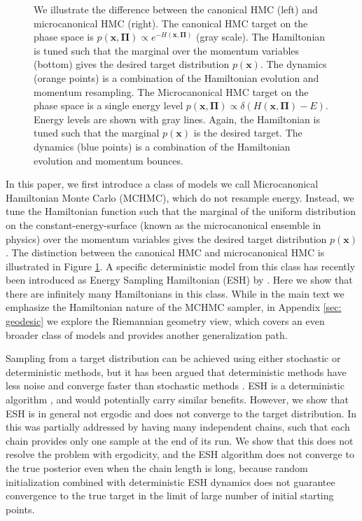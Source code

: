\documentclass[twoside,11pt]{article}
\newcommand{\p}{\boldsymbol{\Pi}}
\newcommand{\x}{\boldsymbol{x}}
\begin{document}
\begin{figure}
    \caption{We illustrate the difference between the canonical HMC (left) and microcanonical HMC (right).
    The canonical HMC target on the phase space is $p(\x, \p) \propto e^{-H(\x, \p)}$ (gray scale). The Hamiltonian is tuned such that the marginal over the momentum variables (bottom) gives the desired target distribution $p(\x)$. The dynamics (orange points) is a combination of the Hamiltonian evolution and momentum resampling.
    The Microcanonical HMC target on the phase space is a single energy level $p(\x, \p) \propto \delta(H(\x, \p) - E)$. Energy levels are shown with gray lines. Again, the Hamiltonian is tuned such that the marginal $p(\x)$ is the desired target. The dynamics  (blue points) is a combination of the Hamiltonian evolution and momentum bounces. 
    } 
    \label{fig: illustration}
\end{figure}


In this paper, we first introduce a class of 
models we call Microcanonical Hamiltonian Monte Carlo (MCHMC), which do not  resample energy. Instead, we tune the Hamiltonian function such that the marginal of the uniform distribution on the constant-energy-surface (known as the microcanonical ensemble in physics) over the momentum variables gives the desired target distribution $p(\x)$. 
The distinction between the canonical HMC and microcanonical HMC is illustrated in Figure \ref{fig: illustration}.
A specific deterministic model from this 
class has recently been introduced as 
Energy Sampling Hamiltonian (ESH) by \cite{ESH}. Here we 
show that there are 
infinitely many Hamiltonians in this class. While
in the main text we emphasize
the Hamiltonian nature of the MCHMC
sampler, in Appendix \ref{sec: geodesic} 
we explore the Riemannian geometry view,
which covers an even broader class of 
models and provides another 
generalization path.

Sampling from a target distribution 
can be achieved using either
stochastic or deterministic 
methods, but it has been argued
that deterministic methods 
have less noise and 
converge faster than 
stochastic methods \citep{DLMC}. ESH 
is a
deterministic algorithm 
\citep{ESH}, and would potentially carry similar benefits. However, 
we show that ESH is in general not ergodic and does not 
converge to the target distribution. In \cite{ESH} this was partially addressed by 
having many independent chains, 
such that each chain provides only 
one sample at the end of its run. 
We show that this does not resolve the 
problem with ergodicity, and the
ESH algorithm does not converge 
to the true posterior even when the chain 
length is long, because random 
initialization 
combined with deterministic ESH dynamics does 
not guarantee convergence to the 
true target in the 
limit of large number of initial 
starting points. 
\end{document}
